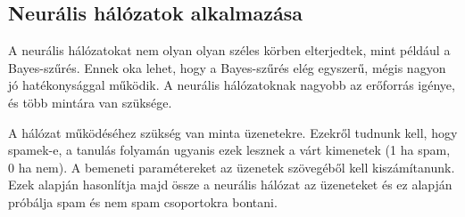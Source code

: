 \documentclass[a4paper]{article}
\begin{document}
\subsection{Neurális hálózatok alkalmazása}
A neurális hálózatokat nem olyan olyan széles körben elterjedtek, mint például a Bayes-szűrés. Ennek oka lehet, hogy a Bayes-szűrés elég egyszerű, mégis nagyon jó hatékonysággal működik. A neurális hálózatoknak nagyobb az erőforrás igénye, és több mintára van szüksége.

A hálózat működéséhez szükség van minta üzenetekre. Ezekről tudnunk kell, hogy spamek-e, a tanulás folyamán ugyanis ezek lesznek a várt kimenetek (1 ha spam, 0 ha nem). A bemeneti paramétereket az üzenetek szövegéből kell kiszámítanunk. Ezek alapján hasonlítja majd össze a neurális hálózat az üzeneteket és ez alapján próbálja spam és nem spam csoportokra bontani.
\end{document}
